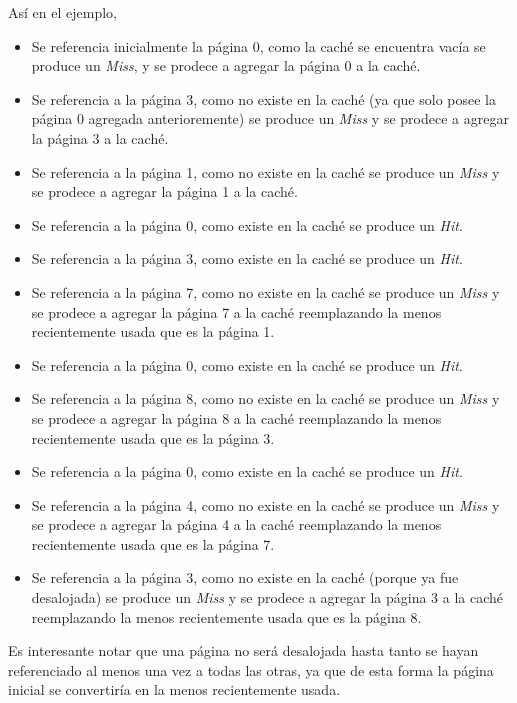 \documentclass[11pt, a4paper, spanish]{article}
\begin{document}
As\'i en el ejemplo, 
\begin{itemize}
	\item{ Se referencia inicialmente la p\'agina 0, como la cach\'e se encuentra vac\'ia se produce un \textit{Miss}, y se prodece a agregar
		la p\'agina 0 a la cach\'e.}
	\item{ Se referencia a la p\'agina 3, como no existe en la cach\'e (ya que solo posee la p\'agina 0 agregada anterioremente) se produce 
		un \textit{Miss} y se prodece a agregar la p\'agina 3 a la cach\'e.}
	\item{ Se referencia a la p\'agina 1, como no existe en la cach\'e se produce un \textit{Miss} y se prodece a agregar la p\'agina 1 a la cach\'e.}
	\item{ Se referencia a la p\'agina 0, como existe en la cach\'e se produce un \textit{Hit}. }
	\item{ Se referencia a la p\'agina 3, como existe en la cach\'e se produce un \textit{Hit}. }
	\item{ Se referencia a la p\'agina 7, como no existe en la cach\'e se produce un \textit{Miss} y se prodece a agregar la p\'agina 7 a la cach\'e
		reemplazando la menos recientemente usada que es la p\'agina 1. }
	\item{ Se referencia a la p\'agina 0, como existe en la cach\'e se produce un \textit{Hit}. }
	\item{ Se referencia a la p\'agina 8, como no existe en la cach\'e se produce un \textit{Miss} y se prodece a agregar la p\'agina 8 a la cach\'e
		reemplazando la menos recientemente usada que es la p\'agina 3. }
	\item{ Se referencia a la p\'agina 0, como existe en la cach\'e se produce un \textit{Hit}. }
	\item{ Se referencia a la p\'agina 4, como no existe en la cach\'e se produce un \textit{Miss} y se prodece a agregar la p\'agina 4 a la cach\'e
		reemplazando la menos recientemente usada que es la p\'agina 7. }
	\item{ Se referencia a la p\'agina 3, como no existe en la cach\'e (porque ya fue desalojada) se produce un \textit{Miss} y se prodece a agregar 
		la p\'agina 3 a la cach\'e reemplazando la menos recientemente usada que es la p\'agina 8. }
\end{itemize}

Es interesante notar que una p\'agina no ser\'a desalojada hasta tanto se hayan referenciado al menos una vez a todas las otras, ya que de esta forma
la p\'agina inicial se convertir\'ia en la menos recientemente usada.\\
\end{document}
